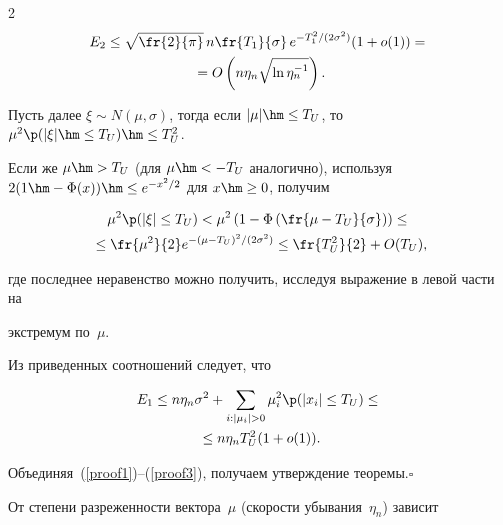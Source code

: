 \begin{multicols}{2}
\begin{multline}

\label{proof2}

E_2 \leq \sqrt{\fr{2}{\pi}} \, n \fr{T_1}{\sigma}\, e^{-T_1^2/(2\sigma^2)}(1 + o(1)) = {}\\

{}=

O\left(n \eta_n \sqrt{\ln \eta_n^{-1}}\right). 

\end{multline}

Пусть далее $\xi \sim N(\mu,\sigma)$, тогда если $|\mu| \hm\leq T_U$, то $\mu^2 \p 

(|\xi|\hm\leq T_U) \hm\leq T_U^2$.

Если же $\mu \hm> T_U$ (для $\mu\hm < -T_U$ аналогично), используя $2(1\hm-\Phi(x))\hm \leq 

e^{-x^2/2}$ для $x\hm\geq 0$, получим

\begin{multline*}

\mu^2 \p (|\xi|\leq T_U) < \mu^2 \left(1-\Phi\left(\fr{\mu- T_U}{\sigma}\right)\right) \leq{}\\

{}\leq \fr{\mu^2}{2} e^{-(\mu-T_U)^2/(2\sigma^2)}  \leq \fr{T_U^2}{2}+O(T_U),

\end{multline*}

где последнее неравенство можно получить, исследуя выражение в левой части на 

экстремум по~$\mu$.

Из приведенных соотношений следует, что

\begin{multline}

\label{proof3}

E_1 \leq n\eta_n \sigma^2 + \sum\limits_{i : |\mu_i| > 0} \mu_i^2 \p (|x_i|\leq 

T_U)\leq{}\\

{}\leq  n \eta_n T_U^2 (1+o(1)).

\end{multline}

Объединяя~(\ref{proof1})--(\ref{proof3}), получаем утверждение тео\-ре\-мы.\hfill$\square$



\smallskip



От степени разреженности вектора~$\mu$ (ско\-рости убывания~$\eta_n$) зависит 


\end{multicols}

